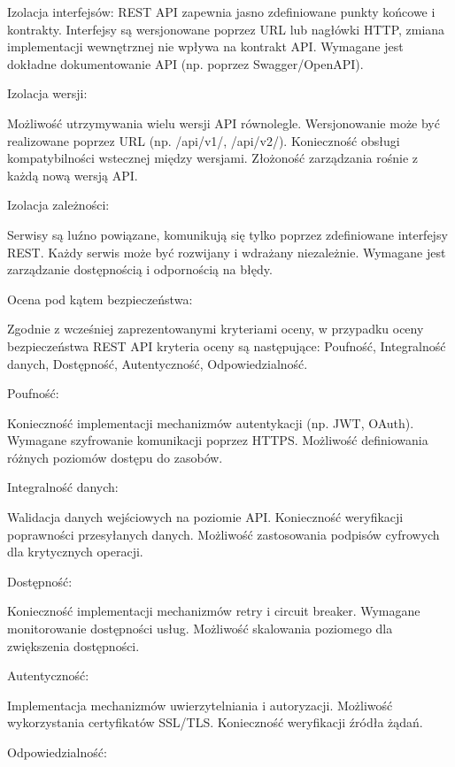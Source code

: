 \documentclass[runningheads,12pt]{llncs}
\begin{document}
Izolacja interfejsów: REST API zapewnia jasno zdefiniowane punkty końcowe i kontrakty. Interfejsy są wersjonowane poprzez URL lub nagłówki HTTP, zmiana implementacji wewnętrznej nie wpływa na kontrakt API. Wymagane jest dokładne dokumentowanie API (np. poprzez Swagger/OpenAPI). ~\cite[p. 124]{richardson2013rest}

Izolacja wersji:

Możliwość utrzymywania wielu wersji API równolegle. Wersjonowanie może być realizowane poprzez URL (np. /api/v1/, /api/v2/). Konieczność obsługi kompatybilności wstecznej między wersjami. Złożoność zarządzania rośnie z każdą nową wersją API. ~\cite[p. 89]{richardson2013rest}\

Izolacja zależności:

Serwisy są luźno powiązane, komunikują się tylko poprzez zdefiniowane interfejsy REST. Każdy serwis może być rozwijany i wdrażany niezależnie. Wymagane jest zarządzanie dostępnością i odpornością na błędy. ~\cite[p. 156]{newman2015building}

Ocena pod kątem bezpieczeństwa:

Zgodnie z wcześniej zaprezentowanymi kryteriami oceny, w przypadku oceny bezpieczeństwa REST API kryteria oceny są następujące: Poufność, Integralność danych, Dostępność, Autentyczność, Odpowiedzialność.

Poufność:

Konieczność implementacji mechanizmów autentykacji (np. JWT, OAuth). Wymagane szyfrowanie komunikacji poprzez HTTPS. Możliwość definiowania różnych poziomów dostępu do zasobów. ~\cite[p. 245]{newman2015building}

Integralność danych:

Walidacja danych wejściowych na poziomie API. Konieczność weryfikacji poprawności przesyłanych danych. Możliwość zastosowania podpisów cyfrowych dla krytycznych operacji. ~\cite[p. 267]{newman2015building}

Dostępność:

Konieczność implementacji mechanizmów retry i circuit breaker. Wymagane monitorowanie dostępności usług. Możliwość skalowania poziomego dla zwiększenia dostępności. ~\cite[p. 178]{richardson2013rest}

Autentyczność:

Implementacja mechanizmów uwierzytelniania i autoryzacji. Możliwość wykorzystania certyfikatów SSL/TLS. Konieczność weryfikacji źródła żądań. ~\cite[p. 289]{newman2015building}

Odpowiedzialność:
\end{document}
